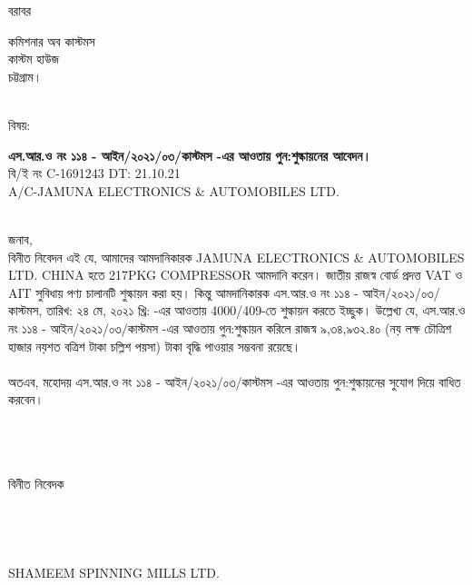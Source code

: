 \documentclass[12pt]{article}
\newcommand{\beno}{C-1691243}
\newcommand{\bedt}{21.10.21}
\newcommand{\co}{CHINA}
\newcommand{\pkg}{217PKG}
\newcommand{\good}{COMPRESSOR}
\newcommand{\impn}{JAMUNA ELECTRONICS \& AUTOMOBILES LTD.}
\newcommand{\cnfn}{SHAMEEM SPINNING MILLS LTD.}
\newcommand{\sro}{এস.আর.ও নং ১১৪ - আইন/২০২১/০৩/কাস্টমস}
\newcommand{\srodt}{তারিখ: ২৪ মে, ২০২১ খ্রি:}
\newcommand{\cpc}{4000/409}
\begin{document}
\noindent
বরাবর
\\
\begin{minipage}[t]{0.05\linewidth}
\hspace{1em}
\end{minipage}
\begin{minipage}[t]{0.95\linewidth}
কমিশনার অব কাস্টমস
\\
কাস্টম হাউজ
\\
চট্টগ্রাম।
\\
\\
\end{minipage}
\begin{minipage}[t]{0.08\linewidth}
বিষয়:
\end{minipage}
\begin{minipage}[t]{0.92\linewidth}
\textbf{{\sro} -এর আওতায় পুন:শুল্কায়নের আবেদন।}
\\
বি/ই নং {\beno} DT: {\bedt}
\\
A/C-{\impn}
\\
\\
\end{minipage}
জনাব,
\\
\hspace*{2.5em}বিনীত নিবেদন এই যে, আমাদের আমদানিকারক {\impn}
{\co} হতে {\pkg} {\good} আমদানি করেন।
জাতীয় রাজস্ব বোর্ড প্রদত্ত VAT ও AIT সুবিধায়
পণ্য চালানটি শুল্কায়ন করা হয়। কিন্তু আমদানিকারক
{\sro}, {\srodt} -এর আওতায় {\cpc}-তে
শুল্কায়ন করতে ইচ্ছুক।
উল্লেখ্য যে, {\sro} -এর আওতায় পুন:শুল্কায়ন করিলে
রাজস্ব ৯,৩৪,৯৩২.৪০
(নয় লক্ষ চৌত্রিশ হাজার নয়শত বত্রিশ টাকা চল্লিশ পয়সা) টাকা
বৃদ্ধি পাওয়ার সম্ভবনা রয়েছে।
\\
\\
অতএব, মহোদয় {\sro} -এর আওতায় পুন:শুল্কায়নের
সুযোগ দিয়ে বাধিত করবেন।
\\
\\
\\
\\
\begin{minipage}[t]{0.50\linewidth}
\hspace{1em}
\end{minipage}
\begin{minipage}[t]{0.60\linewidth}
বিনীত নিবেদক
\\
\\
\\
\\
\\
{\cnfn}
\end{minipage}
\thispagestyle{laststyle}
\end{document}
